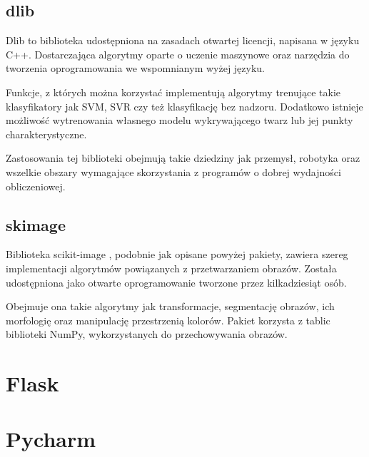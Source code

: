 \subsection{dlib}
Dlib to biblioteka udostępniona na zasadach otwartej licencji, napisana w języku C++. Dostarczająca algorytmy oparte o uczenie maszynowe oraz narzędzia do tworzenia oprogramowania we wspomnianym wyżej języku. 

Funkcje, z których można korzystać implementują algorytmy trenujące takie klasyfikatory jak SVM, SVR czy też klasyfikację bez nadzoru. Dodatkowo istnieje możliwość wytrenowania własnego modelu wykrywającego twarz lub jej punkty charakterystyczne.

Zastosowania tej biblioteki obejmują takie dziedziny jak przemysł, robotyka oraz wszelkie obszary wymagające skorzystania z programów o dobrej wydajności obliczeniowej.

\subsection{skimage}
Biblioteka scikit-image \cite{skimage}, podobnie jak opisane powyżej pakiety, zawiera szereg implementacji algorytmów powiązanych z przetwarzaniem obrazów. Została udostępniona jako otwarte oprogramowanie tworzone przez kilkadziesiąt osób. 

Obejmuje ona takie algorytmy jak transformacje, segmentację obrazów, ich morfologię oraz manipulację przestrzenią kolorów. Pakiet korzysta z tablic biblioteki NumPy, wykorzystanych do przechowywania obrazów.


\section{Flask}
\section{Pycharm}
